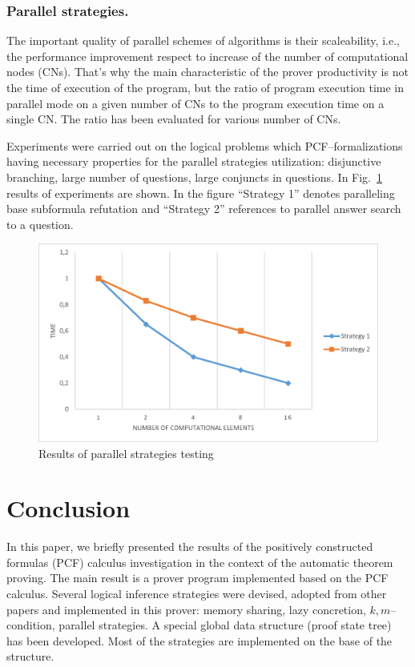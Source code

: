 \documentclass[runningheads,a4paper]{llncs}
\begin{document}
\subsubsection{Parallel strategies.}
The important quality of parallel schemes of algorithms is their scaleability, i.e., the performance improvement respect to increase of the number of computational nodes (CNs). That’s why the main characteristic of the prover productivity is not the time of execution of the program, but the ratio of program execution time in parallel mode on a given number of CNs to the program execution time on a single CN. The ratio has been evaluated for various number of CNs.

Experiments were carried out on the logical problems which PCF--for\-ma\-li\-za\-ti\-ons having necessary properties for the parallel strategies utilization: disjunctive branching, large number of questions, large conjuncts in questions. In Fig.~\ref{fig:parallel} results of experiments are shown. In the figure ``Strategy 1'' denotes paralleling base subformula refutation and ``Strategy 2'' references to parallel answer search to a question.

\begin{figure}[h]
  \centering
  \includegraphics[width=0.8\linewidth]{img/Parallel.eps}
  \caption{Results of parallel strategies testing}
  \label{fig:parallel}
\end{figure}




\section*{Conclusion}
In this paper, we briefly presented the results of the positively constructed formulas (PCF) calculus investigation in the context of the automatic theorem proving. The main result is a prover program implemented based on the PCF calculus. Several logical inference strategies were devised, adopted from other papers and implemented in this prover: memory sharing, lazy concretion, $k,m$--condition, parallel strategies. A special global data structure (proof state tree) has been developed. Most of the strategies are implemented on the base of the structure.
\end{document}
